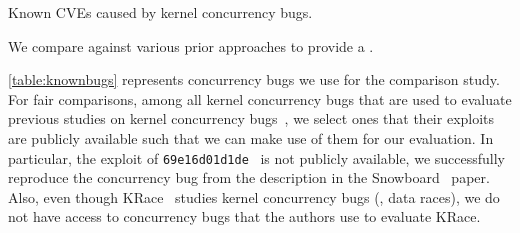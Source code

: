 \begin{table}[t]
  
  \centering
  \caption{Known CVEs caused by kernel concurrency bugs.}
  \label{table:knownbugs}
\end{table}

We compare \sys against various prior approaches to provide a .

%
\autoref{table:knownbugs} represents concurrency bugs we use for the
comparison study.
%
For fair comparisons, among all kernel concurrency bugs that are used
to evaluate previous studies on kernel concurrency bugs~\cite{exprace,
  razzer, snowboard, krace}, we select ones that their exploits are
publicly available such that we can make use of them for our evaluation.
%
In particular, the exploit of
\texttt{69e16d01d1de}~\cite{snowboardbug} is not publicly available,
we successfully reproduce the concurrency bug from the description in
the Snowboard~\cite{snowboard} paper.
%
Also, even though KRace~\cite{krace} studies kernel concurrency bugs
(\ie, data races), we do not have access to concurrency bugs that the
authors use to evaluate KRace.

%







